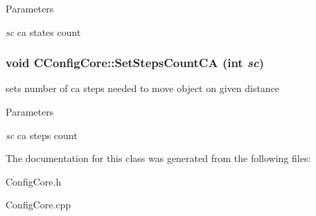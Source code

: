 \begin{DoxyParams}{Parameters}
\item[{\em sc}]ca states count \end{DoxyParams}
\hypertarget{classCConfigCore_a58e039e27357b357be539aab708c892e}{
\subsubsection[{SetStepsCountCA}]{\setlength{\rightskip}{0pt plus 5cm}void CConfigCore::SetStepsCountCA (int {\em sc})}}
\label{classCConfigCore_a58e039e27357b357be539aab708c892e}
sets number of ca steps needed to move object on given distance


\begin{DoxyParams}{Parameters}
\item[{\em sc}]ca steps count \end{DoxyParams}


The documentation for this class was generated from the following files:\begin{DoxyCompactItemize}
\item 
ConfigCore.h\item 
ConfigCore.cpp\end{DoxyCompactItemize}
